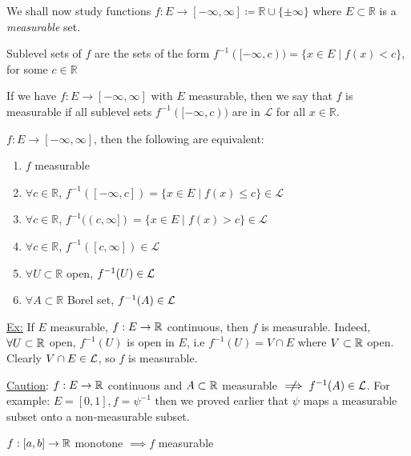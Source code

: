 We shall now study functions $f : E \rightarrow [-\infty, \infty] \coloneqq \mathbb{R} \cup \{ \pm \infty \}$ where $E \subset \mathbb{R}$ is a \emph{measurable} set.

Sublevel sets of $f$ are the sets of the form $f^{-1}([-\infty, c)) = \{ x \in E \mid f(x) < c \}$, for some $c \in \mathbb{R}$

\begin{definition}
    If we have $f : E \rightarrow [-\infty, \infty]$ with $E$ measurable, then we say that $f$ is measurable if all sublevel sets $f^{-1}([-\infty, c))$ are in $\mathcal{L}$ for all $x \in \mathbb{R}$.
\end{definition}

\begin{prop}
    $f : E \rightarrow [-\infty, \infty]$, then the following are equivalent:
    \begin{enumerate}
        \item $f$ measurable
        \item $\forall c \in \mathbb{R}$, $f^{-1}([-\infty, c]) = \{x \in E \mid f(x) \leq c \} \in \mathcal{L}$
        \item $\forall c \in \mathbb{R}$, $f^{-1}((c, \infty]) = \{x \in E \mid f(x) > c \} \in \mathcal{L}$
        \item $\forall c \in \mathbb{R}$, $f^{-1}([c, \infty])  \in \mathcal{L}$
        \item $\forall U \subset \mathbb{R}$ open, $f^{-1}(U) \in \mathcal{L}$
        \item $\forall A \subset \mathbb{R}$ Borel set, $f^{-1}(A) \in \mathcal{L}$
    \end{enumerate}
\end{prop}

\underline{Ex:} If $E$ measurable, $f: E \rightarrow \mathbb{R}$ continuous, then $f$ is measurable.
Indeed, $\forall U \subset \mathbb{R}$ open, $f^{-1}(U)$ is open in $E$, i.e $f^{-1}(U) = V \cap E$ where $V \subset \mathbb{R}$ open.
Clearly $V \cap E \in \mathcal{L}$, so $f$ is measurable.

\underline{Caution}: $f: E \rightarrow \mathbb{R}$ continuous and $A \subset \mathbb{R}$ measurable $\centernot\implies f^{-1}(A) \in \Le$.
For example: $E = [0,1], f = \psi^{-1}$ then we proved earlier that $\psi$ maps a measurable subset onto a non-measurable subset.

\begin{prop}
    $f: [a,b] \rightarrow \mathbb{R}$ monotone $\implies f$ measurable
\end{prop}

